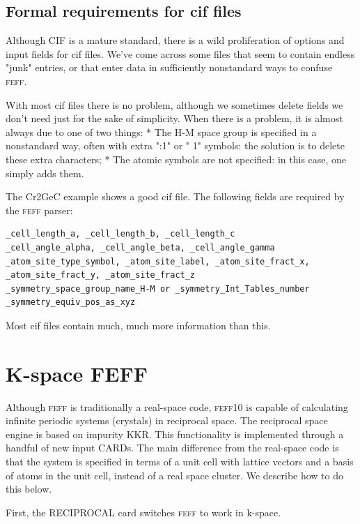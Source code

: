 \documentclass[11pt,oneside]{report} %
\newcommand{\feffcurrent}{\textsc{feff10}}
\newcommand{\program}[1]{\textsc{#1}}
\newcommand{\feff}{\program{feff}}
\begin{document}
\subsection{Formal requirements for cif files}
Although CIF is a mature standard, there is a wild proliferation of options and input fields for cif files.  We've come across some files that seem to contain endless "junk" entries, or that enter data in sufficiently nonstandard ways to confuse {\feff}.

With most cif files there is no problem, although we sometimes delete fields we don't need just for the sake of simplicity.  When there is a problem, it is almost always due to one of two things:
* The H-M space group is specified in a nonstandard way, often with extra ":1" or " 1" symbols: the solution is to delete these extra characters;
* The atomic symbols are not specified: in this case, one simply adds them.

The Cr2GeC example shows a good cif file.  The following fields are required by the {\feff} parser:
\begin{verbatim}_cell_length_a, _cell_length_b, _cell_length_c
_cell_angle_alpha, _cell_angle_beta, _cell_angle_gamma
_atom_site_type_symbol, _atom_site_label, _atom_site_fract_x, _atom_site_fract_y, _atom_site_fract_z
_symmetry_space_group_name_H-M or _symmetry_Int_Tables_number
_symmetry_equiv_pos_as_xyz \end{verbatim}

Most cif files contain much, much more information than this.



\section{K-space FEFF}
\label{sec:kspace}

Although {\feff} is traditionally a real-space code, {\feffcurrent} is capable of calculating infinite periodic systems (crystals) in
reciprocal space.  The reciprocal space engine is based on impurity KKR.  This functionality is implemented through a handful of new input CARDs.  The main difference from the real-space code is that the system is specified in terms of a unit cell with lattice vectors and a basis of atoms in the unit cell, instead of a real space cluster.  We  describe how to do this below.

First, the RECIPROCAL card switches {\feff} to work in k-space.  
\end{document}
